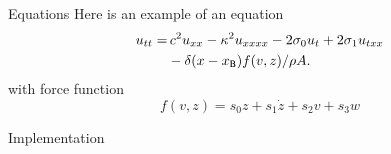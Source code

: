 \documentclass[a0paper,portrait]{baposter}
\let\oldtext\text
\renewcommand{\text}[1]{\oldtext{\fontfamily{ptm}\selectfont #1}}
\begin{document}
\begin{poster}
\begin{posterbox}[name=equation,column=0,below=elasto]{Equations}
Here is an example of an equation
\begin{equation}
\begin{aligned}
  u_{tt} = &\, c^2u_{xx}-\kappa^2u_{xxxx}-2\sigma_0u_t+2\sigma_1u_{txx}\\
  &-\delta(x-x_\text{B})f(v,z)/\rho A.
  \end{aligned}
\end{equation}
with force function
\begin{equation}
    f(v,z) = s_0z+s_1\dot{z}+s_2v+s_3w
\end{equation}
\end{posterbox}

\begin{posterbox}[name=implementation,column=1,row=0]{Implementation}


\end{posterbox}
\end{poster}
\end{document}
